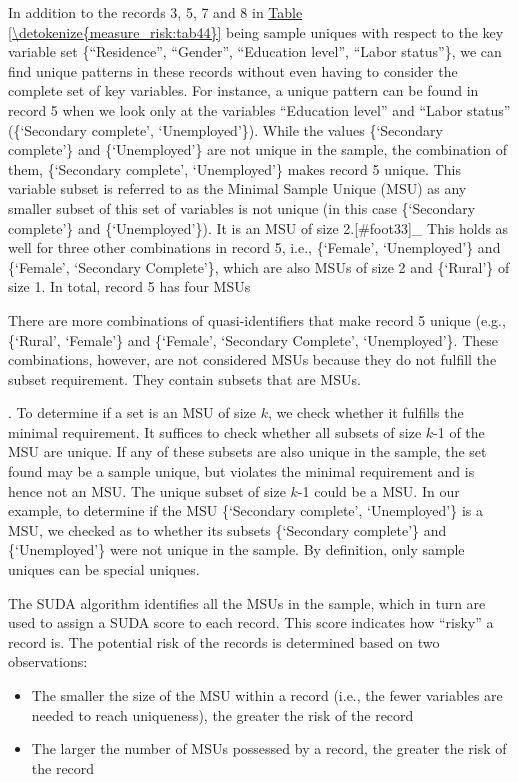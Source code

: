 \documentclass[letterpaper,10pt,english]{sphinxmanual}
\begin{document}
In addition to the records 3, 5, 7 and 8 in \hyperref[\detokenize{measure_risk:tab44}]{Table \ref{\detokenize{measure_risk:tab44}}} being sample
uniques with respect to the key variable set \{“Residence”, “Gender”,
“Education level”, “Labor status”\}, we can find unique patterns in these
records without even having to consider the complete set of key
variables. For instance, a unique pattern can be found in record 5 when
we look only at the variables “Education level” and “Labor status”
(\{‘Secondary complete’, ‘Unemployed’\}). While the values \{‘Secondary
complete’\} and \{‘Unemployed’\} are not unique in the sample, the
combination of them, \{‘Secondary complete’, ‘Unemployed’\} makes record 5
unique. This variable subset is referred to as the Minimal Sample Unique
(MSU) as any smaller subset of this set of variables is not unique (in
this case \{‘Secondary complete’\} and \{‘Unemployed’\}). It is an MSU of
size 2.{[}\#foot33{]}\_ This holds as well
for three other combinations in record 5, i.e., \{‘Female’, ‘Unemployed’\}
and \{‘Female’, ‘Secondary Complete’\}, which are also MSUs of size 2 and
\{‘Rural’\} of size 1. In total, record 5 has four
MSUs %
\begin{footnote}[11]\sphinxAtStartFootnote
There are more combinations of quasi-identifiers that make record 5
unique (e.g., \{‘Rural’, ‘Female’\} and \{‘Female’, ‘Secondary
Complete’, ‘Unemployed’\}. These combinations, however, are not
considered MSUs because they do not fulfill the  subset
requirement. They contain subsets that are MSUs.
%
\end{footnote}. To determine if a set is an MSU of size
\(k\), we check whether it fulfills the minimal requirement. It
suffices to check whether all subsets of size \(k\)-1 of the MSU are
unique. If any of these subsets are also unique in the sample, the set
found may be a sample unique, but violates the minimal requirement and
is hence not an MSU. The unique subset of size \(k\)-1 could be a
MSU. In our example, to determine if the MSU \{‘Secondary complete’,
‘Unemployed’\} is a MSU, we checked as to whether its subsets \{‘Secondary
complete’\} and \{‘Unemployed’\} were not unique in the sample. By
definition, only sample uniques can be special uniques.

The SUDA algorithm identifies all the MSUs in the sample, which in turn
are used to assign a SUDA score to each record. This score indicates how
“risky” a record is. The potential risk of the records is determined
based on two observations:
\begin{itemize}
\item {} 
The smaller the size of the MSU within a record (i.e., the fewer
variables are needed to reach uniqueness), the greater the risk of
the record

\item {} 
The larger the number of MSUs possessed by a record, the greater the
risk of the record

\end{itemize}
\end{document}
